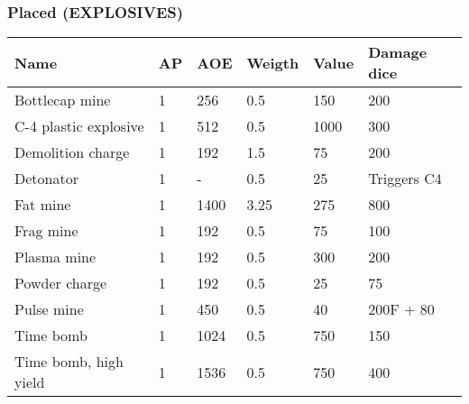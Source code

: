
\subsubsection{Placed (EXPLOSIVES)}
\begin{longtable}{|p{4cm}|p{1.1cm}|p{3cm}|p{3cm}|p{2cm}|p{4cm}|}
\hline
\bfseries Name & \bfseries AP & \bfseries AOE & \bfseries Weigth & \bfseries Value & \bfseries Damage dice \\
\hline
\endhead
Bottlecap mine & 1 & 256 & 0.5 & 150 & 200 \\
C-4 plastic explosive & 1 & 512 & 0.5 & 1000 & 300 \\
Demolition charge & 1 & 192 & 1.5 & 75 & 200 \\
Detonator & 1 & - & 0.5 & 25 & Triggers C4 \\
Fat mine & 1 & 1400 & 3.25 & 275 & 800 \\
Frag mine & 1 & 192 & 0.5 & 75 & 100 \\
Plasma mine & 1 & 192 & 0.5 & 300 & 200 \\
Powder charge & 1 & 192 & 0.5 & 25 & 75 \\
Pulse mine & 1 & 450 & 0.5 & 40 & 200F + 80 \\
Time bomb & 1 & 1024 & 0.5 & 750 & 150 \\
Time bomb, high yield & 1 & 1536 & 0.5 & 750 & 400 \\
\hline
\end{longtable}
